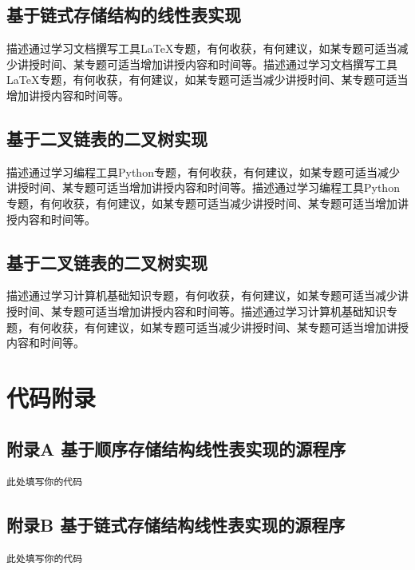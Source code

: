 \documentclass[supercite]{HustGraduPaper}
\theoremstyle{definition}
\begin{document}
    \subsection{基于链式存储结构的线性表实现}

    描述通过学习文档撰写工具LaTeX专题，有何收获，有何建议，如某专题可适当减少讲授时间、某专题可适当增加讲授内容和时间等。描述通过学习文档撰写工具LaTeX专题，有何收获，有何建议，如某专题可适当减少讲授时间、某专题可适当增加讲授内容和时间等。

    \subsection{基于二叉链表的二叉树实现}

    描述通过学习编程工具Python专题，有何收获，有何建议，如某专题可适当减少讲授时间、某专题可适当增加讲授内容和时间等。描述通过学习编程工具Python专题，有何收获，有何建议，如某专题可适当减少讲授时间、某专题可适当增加讲授内容和时间等。

    \subsection{基于二叉链表的二叉树实现}

    描述通过学习计算机基础知识专题，有何收获，有何建议，如某专题可适当减少讲授时间、某专题可适当增加讲授内容和时间等。描述通过学习计算机基础知识专题，有何收获，有何建议，如某专题可适当减少讲授时间、某专题可适当增加讲授内容和时间等。

    \nocite{*}
    \setcounter{secnumdepth}{0}
    \appendix
    \section{代码附录}
    \subsection{附录A 基于顺序存储结构线性表实现的源程序}\label{sec:附录a-基于顺序存储结构线性表实现的源程序}
    \begin{lstlisting}[caption=顺序表,style=顺序表,title=顺序表]
	此处填写你的代码
    \end{lstlisting}
    \newpage


    \subsection{附录B 基于链式存储结构线性表实现的源程序}\label{sec:附录b-基于链式存储结构线性表实现的源程序}
    \begin{lstlisting}[caption=线性表,style=线性表,title=线性表]
	此处填写你的代码
    \end{lstlisting}
    \newpage
\end{document}
